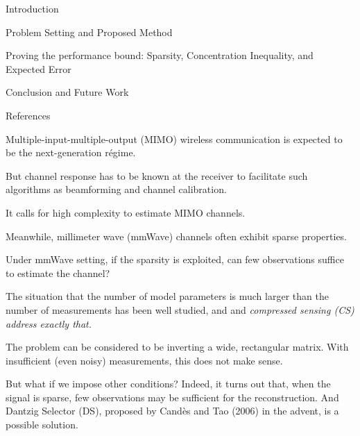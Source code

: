 

\Title {\TitleText}
\blank [big]

\Subtitle {\AuthorText}
\blank [big]

\Subsubtitle {\DateText}

\page [yes]
{
\I Introduction

\I Problem Setting and Proposed Method

\I Proving the performance bound: Sparsity, Concentration Inequality, and Expected Error

\I Conclusion and Future Work

\I References
}
{
\I Multiple-input-multiple-output (MIMO) wireless communication is expected to be the next-generation r\'egime.

\I But channel response has to be known at the receiver to facilitate such algorithms as beamforming and channel calibration.

\I It calls for high complexity to estimate MIMO channels.

\I Meanwhile, millimeter wave (mmWave) channels often exhibit sparse properties.

\I Under mmWave setting, if the sparsity is exploited, can few observations suffice to estimate the channel?
}
{
\I The situation that the number of model parameters is much larger than the number of measurements has been well studied, and and \it{compressed sensing} (CS) address exactly that.

\I The problem can be considered to be inverting a wide, rectangular matrix.
With insufficient (even noisy) measurements, this does not make sense.

\I But what if we impose other conditions?
Indeed, it turns out that, when the signal is sparse, few observations may be sufficient for the reconstruction.
And Dantzig Selector (DS), proposed by Cand\`es and Tao (2006) in the advent, is a possible solution.
}

